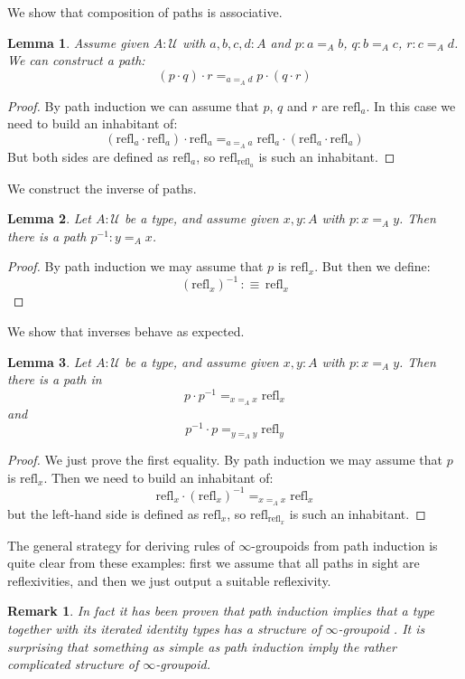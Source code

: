 \documentclass{article}
\newcommand{\U}{{\mathcal U}}
\newcommand{\refl}{\mathrm{refl}}
\newtheorem{lemma}{Lemma}
\newtheorem{remark}{Remark}
\begin{document}
We show that composition of paths is associative.

\begin{lemma}
Assume given $A:\U$ with $a,b,c,d:A$ and $p : a =_A b$, $q:b=_Ac$, $r:c=_Ad$. We can construct a path:
\[(p\cdot q)\cdot r =_{a=_Ad} p\cdot (q\cdot r)\] 
\end{lemma}
\begin{proof}
By path induction we can assume that $p$, $q$ and $r$ are $\refl_a$. In this case we need to build an inhabitant of:
\[(\refl_a\cdot \refl_a)\cdot \refl_a =_{a=_A a} \refl_a\cdot (\refl_a\cdot \refl_a)\]
But both sides are defined as $\refl_a$, so $\refl_{\refl_a}$ is such an inhabitant.
\end{proof}

We construct the inverse of paths.

\begin{lemma}
Let $A:\U$ be a type, and assume given $x,y:A$ with $p:x=_A y$. Then there is a path $p^{-1}:y=_Ax$.
\end{lemma}
\begin{proof}
By path induction we may assume that $p$ is $\refl_x$. But then we define:
\[(\refl_x)^{-1}\, :\equiv \, \refl_x\]
\end{proof}

We show that inverses behave as expected.

\begin{lemma}
Let $A:\U$ be a type, and assume given $x,y:A$ with $p:x=_A y$. Then there is a path in 
\[p\cdot p^{-1} =_{x=_A x}\refl_x \]
and 
\[p^{-1}\cdot p =_{y=_A y}\refl_y \]
\end{lemma}
\begin{proof}
We just prove the first equality. By path induction we may assume that $p$ is $\refl_x$. Then we need to build an inhabitant of:
\[\refl_x\cdot (\refl_x)^{-1} =_{x=_Ax}  \refl_x\]
but the left-hand side is defined as $\refl_x$, so $\refl_{\refl_x}$ is such an inhabitant.
\end{proof}

The general strategy for deriving rules of $\infty$-groupoids from path induction is quite clear from these examples: first we assume that all paths in sight are reflexivities, and then we just output a suitable reflexivity.


\begin{remark}
In fact it has been proven that path induction implies that a type together with its iterated identity types has a structure of $\infty$-groupoid \cite{van2011types}. %
It is surprising that something as simple as path induction imply the rather complicated structure of $\infty$-groupoid. 
\end{remark}
\end{document}
